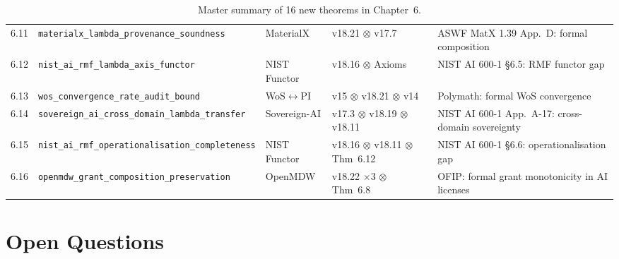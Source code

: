 \begin{table}[ht]
\begin{tabular}{lllll}
6.11 & \texttt{materialx\_lambda\_provenance\_soundness}
     & MaterialX & v18.21 $\otimes$ v17.7
     & ASWF MatX 1.39 App.~D: formal composition \\
6.12 & \texttt{nist\_ai\_rmf\_lambda\_axis\_functor}
     & NIST Functor & v18.16 $\otimes$ Axioms
     & NIST AI 600-1 \S{}6.5: RMF functor gap \\
6.13 & \texttt{wos\_convergence\_rate\_audit\_bound}
     & WoS$\leftrightarrow$PI & v15 $\otimes$ v18.21 $\otimes$ v14
     & Polymath: formal WoS convergence \\
6.14 & \texttt{sovereign\_ai\_cross\_domain\_lambda\_transfer}
     & Sovereign-AI & v17.3 $\otimes$ v18.19 $\otimes$ v18.11
     & NIST AI 600-1 App.~A-17: cross-domain sovereignty \\
6.15 & \texttt{nist\_ai\_rmf\_operationalisation\_completeness}
     & NIST Functor & v18.16 $\otimes$ v18.11 $\otimes$ Thm~6.12
     & NIST AI 600-1 \S{}6.6: operationalisation gap \\
6.16 & \texttt{openmdw\_grant\_composition\_preservation}
     & OpenMDW & v18.22 $\times$3 $\otimes$ Thm~6.8
     & OFIP: formal grant monotonicity in AI licenses \\
\hline
\end{tabular}
\caption{Master summary of 16 new theorems in Chapter~6.}
\label{tab:master-summary}
\end{table}

\section{Open Questions}
\label{sec:open-questions}

